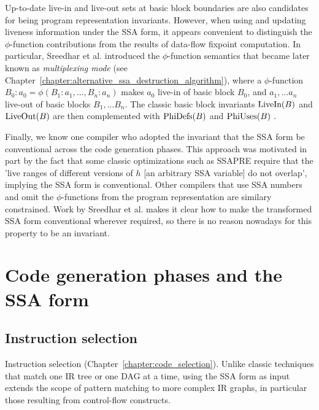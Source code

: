 Up-to-date live-in and live-out sets at basic block boundaries are also
candidates for being program representation invariants. However, when using and
updating liveness information under the SSA form, it appears convenient to
distinguish the $\phi$-function contributions from the results of data-flow
fixpoint computation.  In particular, Sreedhar et al.  \cite{SreedharSep99}
introduced the $\phi$-function semantics that became later known as
\emph{multiplexing mode} (see
Chapter~\ref{chapter:alternative_ssa_destruction_algorithm}), where a
$\phi$-function $B_0:a_0=\phi(B_1:a_1,\dots,B_n:a_n)$ makes $a_0$ live-in of
basic block $B_0$, and $a_1,\dots a_n$ live-out of basic blocks $B_1,\dots B_n$.
The classic basic block invariants $\hbox{LiveIn}(B)$ and $\hbox{LiveOut}(B)$
are then complemented with $\hbox{PhiDefs}(B)$ and $\hbox{PhiUses}(B)$
\cite{Boissinot:2011:APLAS}.

Finally, we know one compiler who adopted the invariant that the SSA form be
conventional across the code generation phases. This approach was motivated in
part by the fact that some classic optimizations such as SSAPRE \cite{CCK+97}
require that the 'live ranges of different versions of $h$ [an arbitrary SSA
variable] do not overlap', implying the SSA form is conventional. Other
compilers that use SSA numbers and omit the $\phi$-functions from the program
representation \cite{Lapkowski:1996:CASCON} are similary constrained. Work by
Sreedhar et al. \cite{SreedharSep99} makes it clear how to make the transformed
SSA form conventional wherever required, so there is no reason nowadays for this
property to be an invariant.




\section{Code generation phases and the SSA form}
\label{sec:ssa-codegen-suitability}

\subsection{Instruction selection}

Instruction selection (Chapter~\ref{chapter:code_selection}). Unlike
classic techniques that match one IR tree or one DAG at a time, using the SSA
form as input extends the scope of pattern matching to more complex IR graphs,
in particular those resulting from control-flow constructs.

